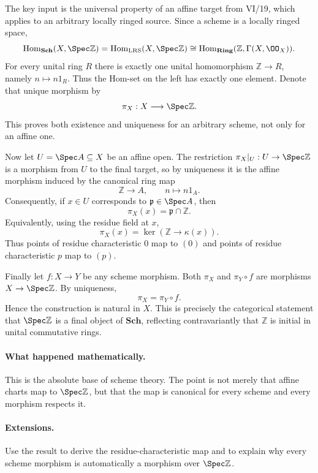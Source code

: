 \begin{solution}
The key input is the universal property of an affine target from VI/19, which applies to an arbitrary locally ringed source.  Since a scheme is a locally ringed space,
\[
\operatorname{Hom}_{\mathbf{Sch}}(X,\Spec\mathbb Z)
=\operatorname{Hom}_{\mathrm{LRS}}(X,\Spec\mathbb Z)
\cong
\operatorname{Hom}_{\mathbf{Ring}}(\mathbb Z,\Gamma(X,\OO_X)).
\]
For every unital ring $R$ there is exactly one unital homomorphism $\mathbb Z\to R$, namely
$n\mapsto n1_R$.  Thus the Hom-set on the left has exactly one element.  Denote that unique
morphism by
\[
\pi_X:X\longrightarrow\Spec\mathbb Z.
\]
This proves both existence and uniqueness for an arbitrary scheme, not only for an affine one.

Now let $U=\Spec A\subseteq X$ be an affine open.  The restriction
$\pi_X|_U:U\to\Spec\mathbb Z$ is a morphism from $U$ to the final target, so by uniqueness it is
the affine morphism induced by the canonical ring map
\[
\mathbb Z\longrightarrow A,\qquad n\longmapsto n1_A.
\]
Consequently, if $x\in U$ corresponds to $\mathfrak p\in\Spec A$, then
\[
\pi_X(x)=\mathfrak p\cap\mathbb Z.
\]
Equivalently, using the residue field at $x$,
\[
\pi_X(x)=\ker(\mathbb Z\to\kappa(x)).
\]
Thus points of residue characteristic $0$ map to $(0)$ and points of residue characteristic
$p$ map to $(p)$.

Finally let $f:X\to Y$ be any scheme morphism.  Both $\pi_X$ and
$\pi_Y\circ f$ are morphisms $X\to\Spec\mathbb Z$.  By uniqueness,
\[
\pi_X=\pi_Y\circ f.
\]
Hence the construction is natural in $X$.  This is precisely the categorical statement that
$\Spec\mathbb Z$ is a final object of $\mathbf{Sch}$, reflecting contravariantly that
$\mathbb Z$ is initial in unital commutative rings.
\end{solution}

\paragraph{What happened mathematically.}
This is the absolute base of scheme theory.  The point is not merely that affine charts map to $\Spec\mathbb Z$, but that the map is canonical for every scheme and every morphism respects it.

\paragraph{Extensions.}
Use the result to derive the residue-characteristic map and to explain why every scheme morphism is automatically a morphism over $\Spec\mathbb Z$.
\fi
